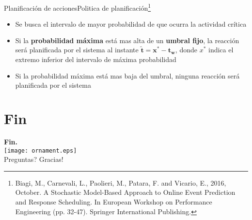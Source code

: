 \documentclass[9pt, handout]{beamer}
\begin{document}
      \begin{frame}{Planificación de acciones}{Politica de planificación\footnote{Biagi, M., Carnevali, L., Paolieri, M., Patara, F. and Vicario, E., 2016, October. A Stochastic Model-Based Approach to Online Event Prediction and Response Scheduling. In European Workshop on Performance Engineering (pp. 32-47). Springer International Publishing.}}
        \begin{itemize}
          \item Se busca el intervalo de mayor probabilidad de que ocurra la actividad crítica
          \item Si la \textbf{probabilidad máxima} está mas alta de un \textbf{umbral fijo}, la reacción será planificada por el sistema al instante $\boldsymbol{\tilde t = x^* - t_w}$, donde $x^*$ indica el extremo inferior del intervalo de máxima probabilidad
          \item Si la probabilidad máxima está mas baja del umbral, ninguna reacción será planificada por el sistema
        \end{itemize}
        \vspace{-1em}
      	\centering
      	
      \end{frame}
      
  \section*{Fin}
    \begin{frame}
      \begin{center}
      	\textbf{\calligra\Huge Fin.}\\
        \texttt{[image: ornament.eps]}\\[1cm]
      	\pause
      	{\huge\calligra Preguntas?\pause{} Gracias!}
      \end{center}
    \end{frame}
      
\end{document}
